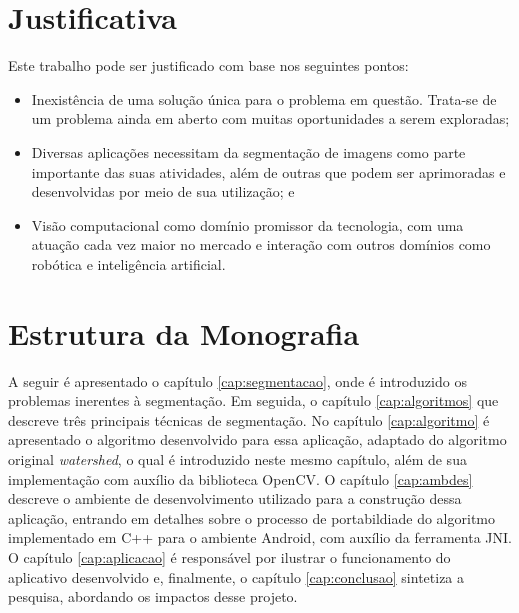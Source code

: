 \section{Justificativa}
Este trabalho pode ser justificado com base nos seguintes pontos:
\begin{itemize}
\item Inexistência de uma solução única para o problema em questão. Trata-se de um problema ainda em aberto com muitas oportunidades a serem exploradas;
\item Diversas aplicações necessitam da segmentação de imagens como parte importante das suas atividades, além de outras que podem ser aprimoradas e desenvolvidas por meio de sua utilização; e
\item Visão computacional como domínio promissor da tecnologia, com uma atuação cada vez maior no mercado e interação com outros domínios como robótica e inteligência artificial.
\end{itemize}

\section{Estrutura da Monografia}

A seguir é apresentado o capítulo \ref{cap:segmentacao}, onde é introduzido os problemas inerentes à segmentação. Em seguida, o capítulo \ref{cap:algoritmos} que descreve três principais técnicas de segmentação. No capítulo \ref{cap:algoritmo} é apresentado o algoritmo desenvolvido para essa aplicação, adaptado do algoritmo original \textit{watershed}, o qual é introduzido neste mesmo capítulo, além de sua implementação com auxílio da biblioteca OpenCV. O capítulo \ref{cap:ambdes} descreve o ambiente de desenvolvimento utilizado para a construção dessa aplicação, entrando em detalhes sobre o processo de portabildiade do algoritmo implementado em C++ para o ambiente Android, com auxílio da ferramenta JNI. O capítulo \ref{cap:aplicacao} é responsável por ilustrar o funcionamento do aplicativo desenvolvido e, finalmente, o capítulo \ref{cap:conclusao} sintetiza a pesquisa, abordando os impactos desse projeto.  






